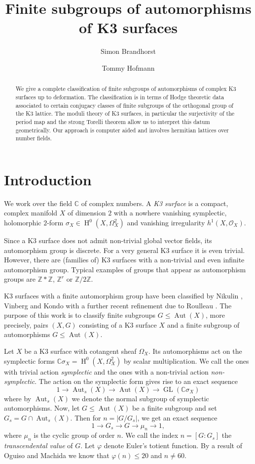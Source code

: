 \documentclass[a4paper]{amsart}
\title[]{Finite subgroups of automorphisms of K3 surfaces}
\author{Simon Brandhorst}
\author{Tommy Hofmann}
\theoremstyle{definition}
\theoremstyle{plain}
\DeclareMathOperator{\GL}{GL}
\DeclareMathOperator{\Aut}{Aut}
\DeclareMathOperator{\HH}{H}
\newcommand{\CC}{\mathbb{C}}
\newcommand{\ZZ}{\mathbb{Z}}
\renewcommand{\O}{\mathcal{O}}
\begin{document}
\begin{abstract}
 We give a complete classification of finite subgroups of automorphisms of complex K3 surfaces up to deformation. The classification is in terms of Hodge theoretic data associated to certain conjugacy classes of finite subgroups of the orthogonal group of the K3 lattice.
 The moduli theory of K3 surfaces, in particular the surjectivity of the period map and the strong Torelli theorem allow us to interpret this datum geometrically. Our approach is computer aided and involves hermitian lattices over number fields.
 \end{abstract}
\maketitle

\setcounter{tocdepth}{1}
\tableofcontents

%
\section{Introduction}
We work over the field $\CC$ of complex numbers.
A \emph{K3 surface} is a compact, complex manifold $X$ of dimension $2$ with a nowhere vanishing symplectic, holomorphic $2$-form $\sigma_X \in \HH^0(X,\Omega^2_X)$ and vanishing irregularity $h^1(X,\O_X)$.

Since a K3 surface does not admit non-trivial global vector fields, its automorphism group is discrete. For a very general K3 surface it is even trivial. However, there are (families of) K3 surfaces with a non-trivial and even infinite automorphism group. Typical examples of groups that appear as automorphism groups are $\ZZ * \ZZ$, $\ZZ^r$ or $\ZZ/2 \ZZ$.

K3 surfaces with a finite automorphism group have been classified by Nikulin \cite{nikulin1981,nikulin1984}, Vinberg \cite{vinberg2007} and Kondo \cite{kondo1989} with a further recent refinement due to Roulleau \cite{Roulleau2021}.
The purpose of this work is to classify finite subgroups
$G \leq \Aut(X)$, more precisely, pairs $(X,G)$ consisting of a K3 surface $X$ and a finite subgroup of automorphisms $G \leq \Aut(X)$.

Let $X$ be a K3 surface with cotangent sheaf $\Omega_X$. Its automorphisms act on the symplectic forms $\CC \sigma_X = \HH^0(X,\Omega^2_X)$ by scalar multiplication. We call the ones with trivial action \emph{symplectic} and the ones with a non-trivial action \emph{non-symplectic}.
The action on the symplectic form gives rise to an exact sequence
\[1 \to \Aut_s(X) \to \Aut(X) \to \GL(\CC \sigma_X)\]
where by $\Aut_s(X)$ we denote the normal subgroup of symplectic automorphisms.
Now, let $G \leq \Aut(X)$ be a finite subgroup and set $G_s = G \cap \Aut_s(X)$. Then for $n = |G/G_s|$, we get an exact sequence
\[1 \to G_s \to G \to \mu_n \to 1, \]
where $\mu_n$ is the cyclic group of order $n$. We call the index $n = [G:G_s]$ the \emph{transcendental value} of $G$.
Let $\varphi$ denote Euler's totient function. By a result of Oguiso and Machida \cite{Oguiso-Machida1998} we know that $\varphi(n) \leq 20$ and $n\neq 60$.
\end{document}
